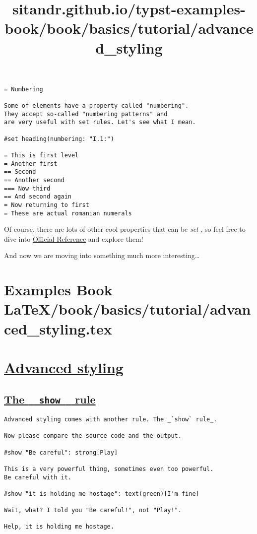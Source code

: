 \begin{verbatim}
= Numbering

Some of elements have a property called "numbering".
They accept so-called "numbering patterns" and
are very useful with set rules. Let's see what I mean.

#set heading(numbering: "I.1:")

= This is first level
= Another first
== Second
== Another second
=== Now third
== And second again
= Now returning to first
= These are actual romanian numerals
\end{verbatim}

\pandocbounded{}

Of course, there are lots of other cool properties that can be
\emph{set} , so feel free to dive into
\href{https://typst.app/docs/reference/}{Official Reference} and explore
them!

And now we are moving into something much more interesting\ldots{}


\section{Examples Book LaTeX/book/basics/tutorial/advanced_styling.tex}
\title{sitandr.github.io/typst-examples-book/book/basics/tutorial/advanced_styling}

\section{\texorpdfstring{\hyperref[advanced-styling]{Advanced
styling}}{Advanced styling}}\label{advanced-styling}

\subsection{\texorpdfstring{\hyperref[the-show-rule]{The
\texttt{\ }{\texttt{\ show\ }}\texttt{\ }
rule}}{The   show   rule}}\label{the-show-rule}

\begin{verbatim}
Advanced styling comes with another rule. The _`show` rule_.

Now please compare the source code and the output.

#show "Be careful": strong[Play]

This is a very powerful thing, sometimes even too powerful.
Be careful with it.

#show "it is holding me hostage": text(green)[I'm fine]

Wait, what? I told you "Be careful!", not "Play!".

Help, it is holding me hostage.
\end{verbatim}

